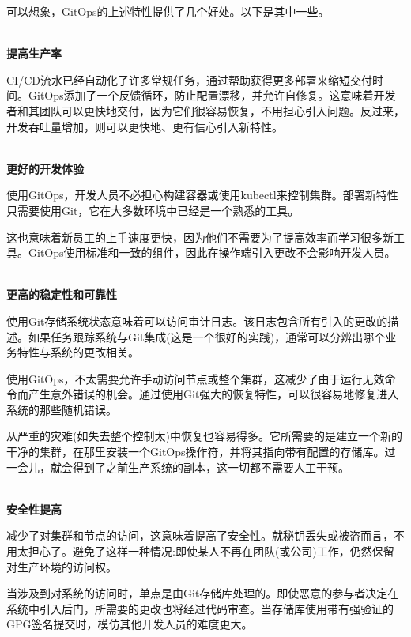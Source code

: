
可以想象，GitOps的上述特性提供了几个好处。以下是其中一些。

\hspace*{\fill} \\ %
\noindent
\textbf{提高生产率}

CI/CD流水已经自动化了许多常规任务，通过帮助获得更多部署来缩短交付时间。GitOps添加了一个反馈循环，防止配置漂移，并允许自修复。这意味着开发者和其团队可以更快地交付，因为它们很容易恢复，不用担心引入问题。反过来，开发吞吐量增加，则可以更快地、更有信心引入新特性。

\hspace*{\fill} \\ %
\noindent
\textbf{更好的开发体验}

使用GitOps，开发人员不必担心构建容器或使用kubectl来控制集群。部署新特性只需要使用Git，它在大多数环境中已经是一个熟悉的工具。

这也意味着新员工的上手速度更快，因为他们不需要为了提高效率而学习很多新工具。GitOps使用标准和一致的组件，因此在操作端引入更改不会影响开发人员。

\hspace*{\fill} \\ %
\noindent
\textbf{更高的稳定性和可靠性}

使用Git存储系统状态意味着可以访问审计日志。该日志包含所有引入的更改的描述。如果任务跟踪系统与Git集成(这是一个很好的实践)，通常可以分辨出哪个业务特性与系统的更改相关。

使用GitOps，不太需要允许手动访问节点或整个集群，这减少了由于运行无效命令而产生意外错误的机会。通过使用Git强大的恢复特性，可以很容易地修复进入系统的那些随机错误。

从严重的灾难(如失去整个控制太)中恢复也容易得多。它所需要的是建立一个新的干净的集群，在那里安装一个GitOps操作符，并将其指向带有配置的存储库。过一会儿，就会得到了之前生产系统的副本，这一切都不需要人工干预。

\hspace*{\fill} \\ %
\noindent
\textbf{安全性提高}

减少了对集群和节点的访问，这意味着提高了安全性。就秘钥丢失或被盗而言，不用太担心了。避免了这样一种情况:即使某人不再在团队(或公司)工作，仍然保留对生产环境的访问权。

当涉及到对系统的访问时，单点是由Git存储库处理的。即使恶意的参与者决定在系统中引入后门，所需要的更改也将经过代码审查。当存储库使用带有强验证的GPG签名提交时，模仿其他开发人员的难度更大。

